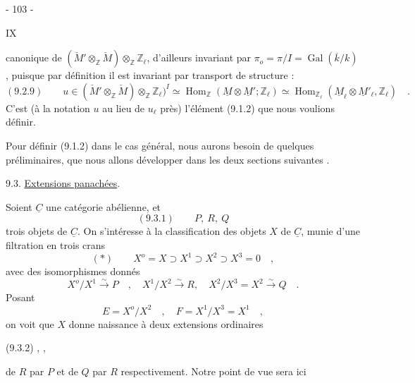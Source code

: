 \begin{center}- 103 -\end{center}\hfill IX

canonique de $(\check M'\otimes_{\mathbb Z}\check M)\otimes_{\mathbb Z}\mathbb Z_\ell$, d'ailleurs invariant par $\pi_o=\pi/I=\operatorname{Gal}(\overline k/k)$, puisque par définition il est invariant par transport de structure :
\[
(9.2.9)\qquad u\in(\check M'\otimes_{\mathbb Z}\check M)\otimes_{\mathbb Z}\mathbb Z_\ell)^I
\simeq\operatorname{Hom}_{\mathbb Z}(\underline M\otimes\underline M';\mathbb Z_\ell)
\simeq\operatorname{Hom}_{\mathbb Z_\ell}(\underline M_\ell\otimes\underline M'_\ell,\mathbb Z_\ell)\quad.
\]
C'est (à la notation $u$ au lieu de $u_\ell$ près) l'élément (9.1.2) que nous voulions définir.

Pour définir (9.1.2) dans le cas général, nous aurons besoin de quelques préliminaires, que nous allons développer dans les deux sections suivantes .

9.3. \uline{Extensions panachées}.

Soient $\underline C$ une catégorie abélienne, et
\[
(9.3.1)\qquad P,\ R,\ Q
\]
trois objets de $\underline C$. On s'intéresse à la classification des objets $X$ de $\underline C$, munie d'une filtration en trois crans
\[
(*)\qquad X^o=X\supset X^1\supset X^2\supset X^3=0\quad,
\]
avec des isomorphismes donnés
\[
X^o/X^1\overset{\sim}{\longrightarrow}P\quad,\quad
X^1/X^2\overset{\sim}{\longrightarrow}R,\quad
X^2/X^3=X^2\overset{\sim}{\longrightarrow}Q\quad.
\]
Posant
\[
E=X^o/X^2\quad,\quad F=X^1/X^3=X^1\quad,
\]
on voit que $X$ donne naissance à deux extensions ordinaires

(9.3.2)
\quad,\quad
{}
\quad,

de $R$ par $P$ et de $Q$ par $R$ respectivement. Notre point de vue sera ici

